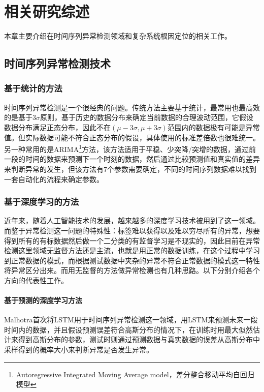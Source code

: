 
\chapter{相关研究综述}
本章主要介绍在时间序列异常检测领域和复杂系统根因定位的相关工作。
\label{cha:intro}
\section{时间序列异常检测技术}
\subsection{基于统计的方法}
时间序列异常检测是一个很经典的问题。传统方法主要基于统计，最常用也最高效的是基于3$\sigma$原则，基于历史的数据分布来确定当前数据的合理波动范围，它假设数据分布满足正态分布，因此不在$(\mu - 3\sigma,\mu + 3\sigma)$范围内的数据极有可能是异常值。但实际数据可能不符合正态分布的假设，具体使用的标准差倍数也很难统一。另一种常用的是ARIMA\footnote{Autoregressive Integrated Moving Average model，差分整合移动平均自回归模型}\cite{contreras2003arima}方法，该方法适用于平稳、少突降/突增的数据，通过前一段的时间的数据来预测下一个时刻的数据，然后通过比较预测值和真实值的差异来判断异常的发生，但该方法有7个参数需要确定，不同的时间序列数据难以找到一套自动化的流程来确定参数。

\subsection{基于深度学习的方法}
近年来，随着人工智能技术的发展，越来越多的深度学习技术被用到了这一领域。而鉴于异常检测这一问题的特殊性：标签难以获得以及难以穷尽所有的异常，想要得到所有的有标数据然后做一个二分类的有监督学习是不现实的，因此目前在异常检测这里领域无监督方法还是主流，也就是用正常的数据训练，在这个过程中学习到正常数据的模式，而根据测试数据中夹杂的异常不符合正常数据的模式这一特性将异常区分出来。而用无监督的方法做异常检测也有几种思路。以下分别介绍各个方向的代表性工作。

\subsubsection{基于预测的深度学习方法}

Malhotra\cite{malhotra2015long}首次将LSTM用于时间序列异常检测这一领域，用LSTM来预测未来一段时间内的数据，并且假设预测误差符合高斯分布的情况下，在训练时用最大似然估计\cite{white1982maximum}来得到高斯分布的参数，测试时则通过预测数据与真实数据的误差从高斯分布中采样得到的概率大小来判断异常是否发生异常。

